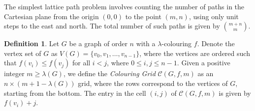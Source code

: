\documentclass{birkjour}
\theoremstyle{definition}
\newtheorem{definition}[theorem]{Definition}
\theoremstyle{remark}
\numberwithin{equation}{section}
\begin{document}
\vspace{0.3cm}
\noindent
The simplest lattice path problem involves counting the number of paths in the Cartesian plane from the origin \( (0,0) \) to the point \( (m, n) \), using only unit steps to the east and north. The total number of such paths is given by $\binom{m+n}{m}$.

\begin{definition}
Let \( G \) be a graph of order \( n \) with a \( \lambda \)-colouring \( f \). Denote the vertex set of \( G \) as \( V(G) = \{ v_0, v_1, \dots, v_{n-1} \} \), where the vertices are ordered such that \( f(v_i) \leq f(v_j) \) for all \( i < j \), where $0 \leq i, j \leq n-1$. Given a positive integer \( m \geq \lambda(G) \), we define the \textit{Colouring Grid} \( \mathcal{C}(G, f, m) \) as an \( n \times (m+1 - \lambda(G)) \) grid, where the rows correspond to the vertices of \( G \), starting from the bottom. The entry in the cell \( (i,j) \) of \( \mathcal{C}(G, f, m) \) is given by \( f(v_i) + j \).
\end{definition}
\end{document}
